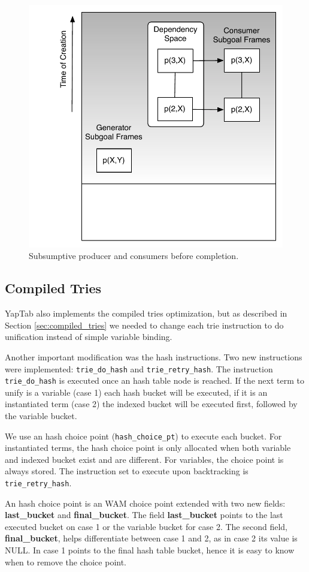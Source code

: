 \begin{figure}[H]
  \centering
    \includegraphics[scale=0.6]{completion_space.pdf}
  \caption{Subsumptive producer and consumers before completion.}
  \label{fig:completion_space}
\end{figure}

\subsection{Compiled Tries}

YapTab also implements the compiled tries optimization, but as described in Section \ref{sec:compiled_tries}
we needed to change each trie instruction to do unification instead of simple variable binding.

Another important modification was the hash instructions. Two new instructions were
implemented: \texttt{trie\_do\_hash} and \texttt{trie\_retry\_hash}.
The instruction \texttt{trie\_do\_hash} is executed once an hash table node is reached.
If the next term to unify is a variable (case 1) each hash bucket will be executed, if it is an instantiated term (case 2)
the indexed bucket will be executed first, followed by the variable bucket.

We use an hash choice point (\texttt{hash\_choice\_pt}) to execute each bucket.
For instantiated terms, the hash choice point is only allocated when both variable and indexed bucket
exist and are different. For variables, the choice point is always stored. The instruction
set to execute upon backtracking is \texttt{trie\_retry\_hash}.

An hash choice point is an WAM choice point extended with two new fields:
\textbf{last\_bucket} and \textbf{final\_bucket}.
The field \textbf{last\_bucket} points to the last executed bucket on case 1 or the
variable bucket for case 2.
The second field, \textbf{final\_bucket}, helps differentiate between
case 1 and 2, as in case 2 its value is NULL. In case 1 points to the final hash table bucket,
hence it is easy to know when to remove the choice point.
